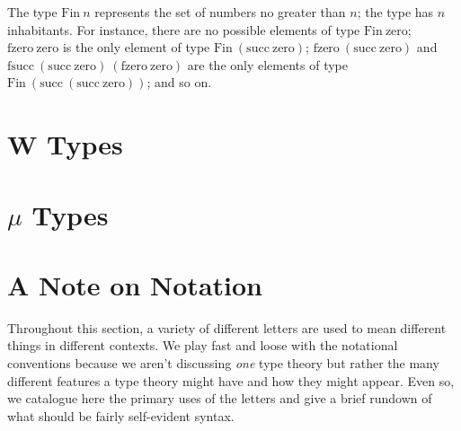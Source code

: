 \documentclass{report}
\newcommand{\zero}{\const{zero}}
\renewcommand{\succ}{\const{succ}}
\newcommand{\Fin}{\const{Fin}}
\newcommand{\fzero}{\const{fzero}}
\newcommand{\fsucc}{\const{fsucc}}
\newcommand{\const}[1]{\text{#1}}
\begin{document}
The type $\Fin ~ n$ represents the set of numbers no greater than $n$; the type has $n$ inhabitants. For instance, there are no possible elements of type $\Fin ~ \zero$; $\fzero ~ \zero$ is the only element of type $\Fin ~ (\succ ~ \zero)$; $\fzero ~ (\succ ~ \zero)$ and $\fsucc ~ (\succ ~ \zero) ~ (\fzero ~ \zero)$ are the only elements of type $\Fin ~ (\succ ~ (\succ ~ \zero))$; and so on.


\section{W Types}

\section{$\mu$ Types}

\section{A Note on Notation}

Throughout this section, a variety of different letters are used to mean different things in different contexts. We play fast and loose with the notational conventions because we aren't discussing \emph{one} type theory but rather the many different features a type theory might have and how they might appear. Even so, we catalogue here the primary uses of the letters and give a brief rundown of what should be fairly self-evident syntax.
\end{document}
